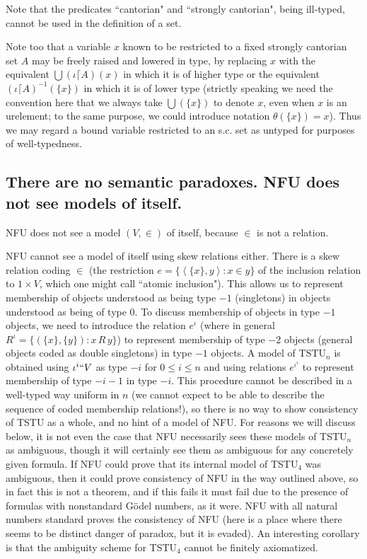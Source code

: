 \documentclass[12pt]{article}
\begin{document}
Note that the predicates ``cantorian" and ``strongly cantorian", being ill-typed, cannot be used in the definition of a set.

Note too that a variable $x$ known to be restricted to a fixed strongly cantorian set $A$ may be freely raised and lowered in type, by replacing $x$ with the equivalent $\bigcup (\iota\lceil A)(x)$ in which it is of higher type
or the equivalent $(\iota \lceil A)^{-1}(\{x\})$ in which it is of lower type (strictly speaking we need the convention here that we always take $\bigcup(\{x\})$ to denote $x$, even when $x$ is an urelement;  to the same purpose, we could introduce notation $\theta(\{x\}) = x$).  Thus we may regard a bound variable restricted to an s.c. set as untyped for purposes of well-typedness.

\subsection{There are no semantic paradoxes.  NFU does not see models of itself.}

NFU does not see a model $(V,\in)$ of itself, because $\in$ is not a relation.

NFU cannot see a model of itself using skew relations either.  There is a skew relation coding $\in$ (the restriction $e = \{\left<\{x\},y\right>:x \in y\}$ of the inclusion relation to $1 \times V$, which one might call ``atomic inclusion").  This allows us to represent membership of objects understood as being type $-1$ (singletons) in objects understood as being of type 0.
To discuss membership of objects in type $-1$ objects, we need to introduce the relation $e^{\iota}$ (where in general $R^{\iota} = \{(\{x\},\{y\}):x \, R\, y\}$) to represent membership of type $-2$ objects (general objects coded as double singletons) in type $-1$ objects.  A model of TSTU$_{n}$ is obtained using $\iota^i``V$ as type $-i$ for $0 \leq i \leq n$ and using relations $e^{\iota^i}$ to represent membership of type $-i-1$ in type $-i$.  This procedure cannot be described in a well-typed way uniform in $n$ (we cannot expect to be able to describe the sequence of coded membership relations!), so there is no way to show consistency of TSTU as a whole, and no hint of a model of NFU.  For reasons we will discuss below, it is not even the case that NFU necessarily sees
these models of TSTU$_n$ as ambiguous, though it will certainly see them as ambiguous for any concretely given formula.  If NFU could prove that its internal model of TSTU$_4$ was ambiguous, then it could prove consistency of NFU in the way outlined above, so in fact this is not a theorem, and if this fails it must fail due to the presence of formulas with nonstandard G\"odel numbers, as it were.  NFU with all natural numbers standard proves the consistency of NFU (here is a place where there seems to be distinct danger of paradox, but it is evaded).  An interesting corollary is that the ambiguity scheme for TSTU$_4$ cannot be finitely axiomatized.
\end{document}
